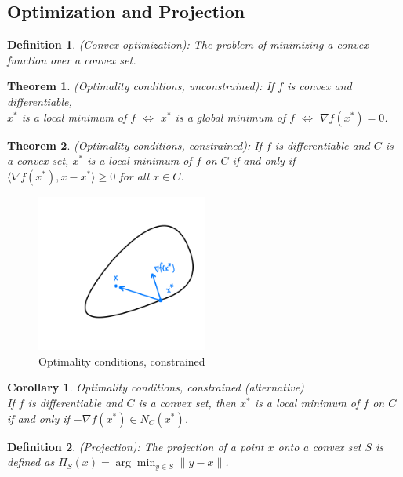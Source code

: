\documentclass[11pt]{book} %
\newtheorem{theorem}{Theorem}[section]
\newtheorem{definition}{Definition}[section]
\newtheorem{corollary}{Corollary}[section]
\begin{document}
\subsection{Optimization and Projection}

\begin{definition} (Convex optimization): The problem of minimizing a convex function over a convex set.
\end{definition}

\begin{theorem} (Optimality conditions, unconstrained): If $f$ is convex and differentiable, \\
     $x^*$ is a local minimum of $f$ $\Leftrightarrow$ $x^*$ is a global minimum of $f$ $\Leftrightarrow$  $\nabla f(x^*) = 0$.
\end{theorem}

\begin{theorem} (Optimality conditions, constrained): If $f$ is differentiable and $C$ is a convex set,
     $x^*$ is a local minimum of $f$ on $C$ if and only if $\langle \nabla f(x^*), x - x^* \rangle \geq 0$ for all $x \in C$.
\end{theorem}

\begin{figure}[H]
    \centering
    \includegraphics[width=0.5\textwidth]{Figs/optimality_condition_constrained.png}
    \caption{Optimality conditions, constrained}
\end{figure}


\begin{corollary}{Optimality conditions, constrained (alternative)} \\
If $f$ is differentiable and $C$ is a convex set, then $x^*$ is a local minimum of $f$ on $C$ if and only if $-\nabla f(x^*) \in N_C(x^*)$.
\end{corollary}

\begin{definition} (Projection): The projection of a point $x$ onto a convex set $S$ is defined as $\Pi_S(x) = \arg\min_{y \in S} \|y-x\|$.
\end{definition}
\end{document}
